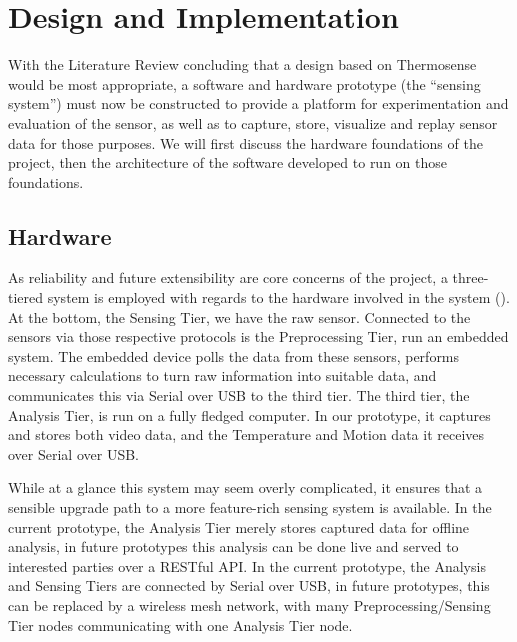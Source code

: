 \documentclass[../thesis/thesis.tex]{subfiles}
\begin{document}
 \chapter{Design and Implementation}

With the Literature Review concluding that a design based on Thermosense would be most appropriate, a software and hardware prototype (the ``sensing system'') must now be constructed to provide a platform for experimentation and evaluation of the sensor, as well as to capture, store, visualize and replay sensor data for those purposes. We will first discuss the hardware foundations of the project, then the architecture of the software developed to run on those foundations.

\section{Hardware}

As reliability and future extensibility are core concerns of the project, a three-tiered system is employed with regards to the hardware involved in the system (). At the bottom, the Sensing Tier, we have the raw sensor. Connected to the sensors via those respective protocols is the Preprocessing Tier, run an embedded system. The embedded device polls the data from these sensors, performs necessary calculations to turn raw information into suitable data, and communicates this via Serial over USB to the third tier. The third tier, the Analysis Tier, is run on a fully fledged computer. In our prototype, it captures and stores both video data, and the Temperature and Motion data it receives over Serial over USB.

While at a glance this system may seem overly complicated, it ensures that a sensible upgrade path to a more feature-rich sensing system is available. In the current prototype, the Analysis Tier merely stores captured data for offline analysis, in future prototypes this analysis can be done live and served to interested parties over a RESTful API. In the current prototype, the Analysis and Sensing Tiers are connected by Serial over USB, in future prototypes, this can be replaced by a wireless mesh network, with many Preprocessing/Sensing Tier nodes communicating with one Analysis Tier node.
\end{document}

